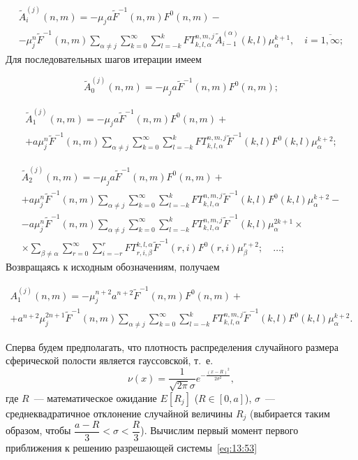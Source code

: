 \begin{multline}
\tilde A_i^{(j)}(n,m)=-\mu_j a \tilde F^{-1}(n,m)F^0(n,m)- \\
-\mu_j^n\tilde F^{-1}(n,m)\sum_{\alpha\neq j}\sum_{k=0}^\infty\sum_{l=-k}^k FT_{k,l,\alpha}^{n,m,j}\tilde A_{i-1}^{(\alpha)}(k,l)\mu_\alpha^{k+1},\quad i=\overline{1,\infty};
\label{eq:13:55}
\end{multline}
Для последовательных шагов итерации имеем

\begin{equation}
\tilde A_0^{(j)}(n,m)=-\mu_j a \tilde F^{-1}(n,m)F^0(n,m);
\label{eq:13:56}
\end{equation}

\begin{multline}
\tilde A_1^{(j)}(n,m)=-\mu_j a \tilde F^{-1}(n,m)F^0(n,m)+ \\
+a\mu_j^n\tilde F^{-1}(n,m)\sum_{\alpha\neq j}\sum_{k=0}^\infty\sum_{l=-k}^k FT_{k,l,\alpha}^{n,m,j}\tilde F^{-1}(k,l)F^0(k,l)\mu_\alpha^{k+2};
\label{eq:13:57}
\end{multline}

\begin{multline}
\tilde A_2^{(j)}(n,m)=-\mu_j a \tilde F^{-1}(n,m)F^0(n,m)+ \\
+a\mu_j^n\tilde F^{-1}(n,m)\sum_{\alpha\neq j}\sum_{k=0}^\infty\sum_{l=-k}^k FT_{k,l,\alpha}^{n,m,j}\tilde F^{-1}(k,l)F^0(k,l)\mu_\alpha^{k+2}- \\
-a\mu_j^n\tilde F^{-1}(n,m)\sum_{\alpha\neq j}\sum_{k=0}^\infty\sum_{l=-k}^k FT_{k,l,\alpha}^{n,m,j}\tilde F^{-1}(k,l)\mu_\alpha^{2k+1}\times \\
\times\sum_{\beta\neq \alpha}\sum_{r=0}^\infty\sum_{i=-r}^r FT_{r,i,\beta}^{k,l,\alpha}\tilde F^{-1}(r,i)F^0(r,i)\mu_\beta^{r+2};\quad\dots;
\label{eq:13:58}
\end{multline}
Возвращаясь к исходным обозначениям, получаем

\begin{multline}
A_1^{(j)}(n,m)=-\mu_j^{n+2} a^{n+2} \tilde F^{-1}(n,m)F^0(n,m)+ \\
+a^{n+2}\mu_j^{2n+1}\tilde F^{-1}(n,m)\sum_{\alpha\neq j}\sum_{k=0}^\infty\sum_{l=-k}^k FT_{k,l,\alpha}^{n,m,j}\tilde F^{-1}(k,l)F^0(k,l)\mu_\alpha^{k+2}.
\label{eq:13:59}
\end{multline}

Сперва будем предполагать, что плотность распределения случайного размера сферической полости является гауссовской, т.~е.
$$
\nu(x)=\frac{1}{\sqrt{2\pi}\sigma}e^{-\frac{(x-R)^2}{2\sigma^2}},
$$
где $R$~--- математическое ожидание $E[R_j]$ ($R\in [0,a]$), $\sigma$~--- среднеквадратичное отклонение случайной величины $R_j$ (выбирается таким образом, чтобы $\dfrac{a-R}{3}<\sigma<\dfrac{R}{3}$). Вычислим первый момент первого приближения к решению разрешающей системы~\eqref{eq:13:53}

